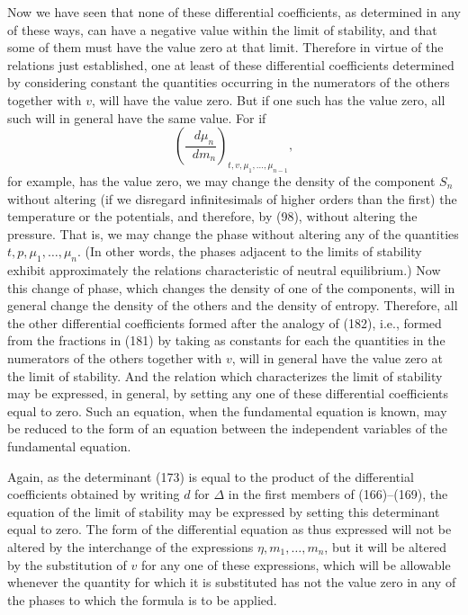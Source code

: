 \documentclass[11pt]{article}
\newcommand{\dd}{\mathop{}\!d}
\newcommand{\D}{\Delta}
\begin{document}
Now we have seen that none of these differential coefficients, as determined in any of these ways, can have a negative value within the limit of stability, and that some of them must have the value zero at that limit. Therefore in virtue of the relations just established, one at least of these differential coefficients determined by considering constant the quantities occurring in the numerators of the others together with $v$, will have the value zero. But if one such has the value zero, all such will in general have the same value. For if
\begin{equation}
\left(\frac{\dd\mu_n}{\dd m_n}\right)_{t,v,\mu_1,\ldots,\mu_{n-1}},
\end{equation}
for example, has the value zero, we may change the density of the component $S_n$ without altering (if we disregard infinitesimals of higher orders than the first) the temperature or the potentials, and therefore, by (98), without altering the pressure. That is, we may change the phase without altering any of the quantities $t,p,\mu_1,\ldots,\mu_n$. (In other words, the phases adjacent to the limits of stability exhibit approximately the relations characteristic of neutral equilibrium.) Now this change of phase, which changes the density of one of the components, will in general change the density of the others and the density of entropy. Therefore, all the other differential coefficients formed after the analogy of (182), i.e., formed from the fractions in (181) by taking as constants for each the quantities in the numerators of the others together with $v$, will in general have the value zero at the limit of stability. And the relation which characterizes the limit of stability may be expressed, in general, by setting any one of these differential coefficients equal to zero. Such an equation, when the fundamental equation is known, may be reduced to the form of an equation between the independent variables of the fundamental equation.

Again, as the determinant (173) is equal to the product of the differential coefficients obtained by writing $d$ for $\D$ in the first members of (166)--(169), the equation of the limit of stability may be expressed by setting this determinant equal to zero. The form of the differential equation as thus expressed will not be altered by the interchange of the expressions $\eta,m_1,\ldots,m_n$, but it will be altered by the substitution of $v$ for any one of these expressions, which will be allowable whenever the quantity for which it is substituted has not the value zero in any of the phases to which the formula is to be applied.
\end{document}
